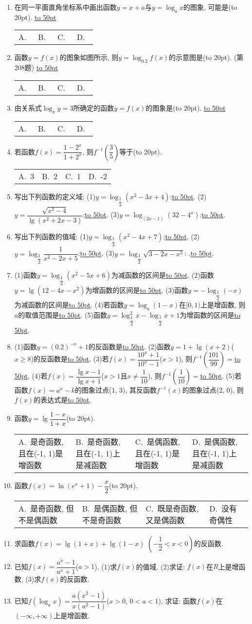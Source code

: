 \documentclass[10pt,a4paper]{article}
\newcommand{\blank}[1]{\underline{\hbox to #1pt{}}}
\newcommand{\bracket}[1]{(\hbox to #1pt{})}
\newcommand{\fourch}[4]{\par\begin{tabular}{p{.23\textwidth}p{.23\textwidth}p{.23\textwidth}p{.23\textwidth}}
A.~#1 &B.~#2& C.~#3& D.~#4
\end{tabular}}
\begin{document}
\begin{enumerate}[1.]
\item 在同一平面直角坐标系中画出函数$y=x+a$与$y=\log _ax$的图象, 可能是\bracket{20}.
\blank{50}\fourch{}{}{}{}
\item 函数$y=f(x)$的图象如图所示, 则$y=\log _{0.2}f(x)$的示意图是\bracket{20}.
(第208题)
\blank{50}\fourch{}{}{}{}
\item 由关系式$\log _xy=3$所确定的函数$y=f(x)$的图象是\bracket{20}.
\blank{50}\fourch{}{}{}{}
\item 若函数$f(x)=\dfrac{1-2^x}{1+2^x}$, 则$f^{-1}(\dfrac 35)$等于\bracket{20}.
\fourch{3}{2}{1}{-2}
\item 写出下列函数的定义域:
(1)$y=\log _{\dfrac 13}(x^2-3x+4)$:\blank{50}.
(2)$y=\dfrac{\sqrt {x^2-4}}{\lg (x^2+2x-3)}$:\blank{50}.
(3)$y=\log _{(2x-1)}(32-4^x)$:\blank{50}.
\item 写出下列函数的值域:
(1)$y=\log _{\dfrac 13}(x^2-4x+7)$:\blank{50}.
(2)$y=\log _{\dfrac 12}\dfrac 1{x^2-2x+5}$:\blank{50}.
(3)$y=\log _{\dfrac 12}\sqrt {3-2x-x^2}$: .\blank{50}.
\item (1)函数$y=\log _{\dfrac 13}(x^2-5x+6)$为减函数的区间是\blank{50}.
(2)函数$y=\lg (12-4x-x^2)$为增函数的区间是\blank{50}.
(3)函数$y=-\log _{\dfrac 12}(-x)$为减函数的区间是\blank{50}.
(4)若函数$y=\log _a(1-x)$在$[0,1)$上是增函数, 则$a$的取值范围是\blank{50}.
(5)函数$y=\log _{\dfrac 12}^2x-\log _{\dfrac 12}x+1$为增函数的区间是\blank{50}.
\item (1)函数$y=(0.2)^{-x}+1$的反函数是\blank{50}.
(2)函数$y=1+\lg (x+2)$($x\ge 8$)的反函数是\blank{50}.
(3)若$f(x)=\dfrac{10^x+1}{10^x-1}$($x>1$), 则$f^{-1}(\dfrac{101}{99})=$\blank{50}.
(4)若$f(x)=\dfrac{\lg x-1}{\lg x+1}$($x>1$且$x\ne \dfrac 1{10}$), 则$f^{-1}(\dfrac 1{10})=$\blank{50}.
(5)若函数$f(x)=a^x-k$的图象过点(1, 3), 其反函数$f^{-1}(x)$的图象过点(2, 0), 则$f(x)$的表达式是\blank{50}.
\item 函数$y=\lg \dfrac{1-x}{1+x}$\bracket{20}.
\fourch{是奇函数, 且在(-1, 1)是增函数}{是奇函数, 且在(-1, 1)上是减函数}{是偶函数, 且在(-1, 1)是增函数}{是偶函数, 且在(-1, 1)上是减函数}
\item 函数$f(x)=\ln (e^x+1)-\dfrac x2$\bracket{20}.
\fourch{是奇函数, 但不是偶函数}{是偶函数, 但不是奇函数}{既是奇函数, 又是偶函数}{没有奇偶性}
\item 求函数$f(x)=\lg (1+x)+\lg (1-x)$ $(-\dfrac 12<x<0)$的反函数.
\item 已知$f(x)=\dfrac{a^x-1}{a^x+1}$($a>1$).
(1)求$f(x)$的值域.
(2)求证: $f(x)$在$R$上是增函数.
(3)求$f(x)$的反函数.
\item 已知$f(\log _ax)=\dfrac{a(x^2-1)}{x(a^2-1)}$($x>0$, $0<a<1$), 求证: 函数$f(x)$在$(-\infty ,+\infty)$上是增函数.

\end{enumerate}
\end{document}
